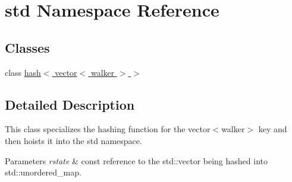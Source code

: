 \hypertarget{namespacestd}{\section{std Namespace Reference}
\label{namespacestd}
}
\subsection*{Classes}
\begin{DoxyCompactItemize}
\item 
class \hyperlink{classstd_1_1hash_3_01vector_3_01walker_01_4_01_4}{hash$<$ vector$<$ walker $>$ $>$}
\end{DoxyCompactItemize}


\subsection{Detailed Description}
This class specializes the hashing function for the vector$<$walker$>$ key and then hoists it into the std namespace. 
\begin{DoxyParams}{Parameters}
{\em rstate} & const reference to the std\+::vector being hashed into std\+::unordered\+\_\+map. \\
\hline
\end{DoxyParams}
